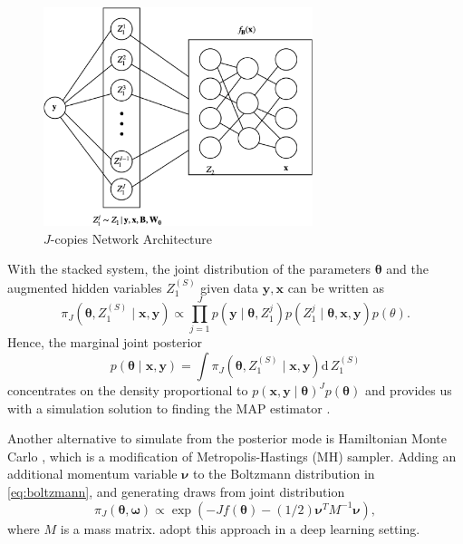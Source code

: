 \documentclass[ba]{imsart}
\newcommand{\bm}[1]{\boldsymbol{#1}}
\renewcommand{\d}{\mathrm{d}}
\def\bomega{\bm{\omega}}
\def\B{\bm{B}}
\def\x{\bm{x}}
\def\btheta{\bm{\theta}}
\renewcommand{\d}{\mathrm{d}\,}
\newcommand{\bx}{{\bm x}}
\newcommand{\by}{{\bm y}}
\numberwithin{equation}{section}
\theoremstyle{plain}
\begin{document}
\begin{figure}[!ht]
\centering
\includegraphics[width=0.7\textwidth, height=0.6\textwidth]{fig/arch_2.eps}
\vspace{-0.1in}
\caption{$J$-copies Network Architecture}\label{fig:arch}
\vspace{-0.1in}
\end{figure}


With the stacked system, the joint distribution of the parameters $\btheta$ and the augmented hidden variables $Z_1^{(S)}$ given data $\by, \bx$ can be written as
\[
\pi_J(\btheta,  Z_1^{(S)}\mid \bx, \by)\propto  \prod_{j=1}^J p(\by \mid \btheta,  Z_1^j)p(Z_1^j\mid \btheta, \x, \by) p(\theta).
\]
Hence,  the marginal joint posterior
 \[
 p(\btheta \mid \bx, \by) = \int \pi_J(\btheta, Z_1^{(S)} \mid \bx, \by) \d  Z_1^{(S)}
 \]  
concentrates on the density proportional to  $p( \bx,\by \mid \btheta)^Jp(\btheta)$ and  provides us with  a simulation solution to finding the MAP estimator \citep{pincus1968letter, pincus1970letter}.



Another alternative to simulate from the posterior mode is Hamiltonian Monte Carlo \citep{neal2011mcmc}, which is a modification of Metropolis-Hastings (MH) sampler. Adding an additional momentum variable $\bm{\nu}$ to the Boltzmann distribution in \eqref{eq:boltzmann}, and generating draws from joint distribution
\[
\pi_J(\btheta, \bomega ) \propto \exp \left(-J f(\btheta) - (1/2) {\bm{\nu}}^TM^{-1} \bm{\nu}\right),
\]
where $M$ is a mass matrix. \citet{chen2014stochastic} adopt this approach in a deep learning setting.
\end{document}

